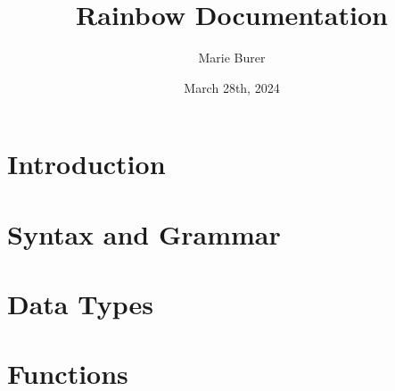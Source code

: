 \documentclass[12pt]{article}
\title{Rainbow Documentation}
\author{Marie Burer}
\date{March 28th, 2024}
\begin{document}
\maketitle
\newpage
\tableofcontents
\newpage

\section*{Introduction}

\section{Syntax and Grammar}

\section{Data Types}

\section{Functions}
\end{document}
